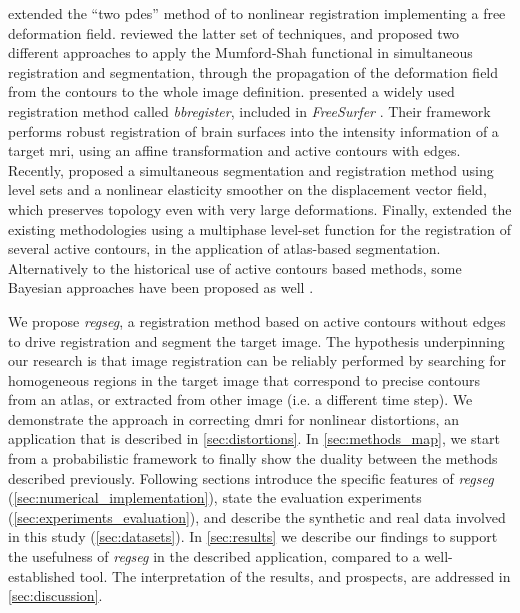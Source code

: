   extended the ``two \glspl*{pde}'' method of \cite{yezzi_variational_2001}
  to nonlinear registration implementing a free deformation field.
\cite{droske_mumfordshah_2009} reviewed the latter set of techniques, and proposed two different
  approaches to apply the Mumford-Shah functional \citep{mumford_optimal_1989} in simultaneous
  registration and segmentation, through the propagation of the deformation field from
  the contours to the whole image definition.
\cite{greve_accurate_2009} presented a widely used registration method called \emph{bbregister},
  included in \emph{FreeSurfer} \citep{fischl_freesurfer_2012}.
Their framework performs robust registration of brain surfaces into the intensity information
  of a target \gls*{mri}, using an affine transformation and active contours with edges.
Recently, \cite{guyader_combined_2011} proposed a simultaneous segmentation and
  registration method using level sets and a nonlinear elasticity smoother on the
  displacement vector field, which preserves topology even with very large deformations.
Finally, \cite{gorthi_active_2011} extended the existing methodologies using a multiphase
  level-set function for the registration of several active contours, in the application
  of atlas-based segmentation.
Alternatively to the historical use of active contours based methods, some Bayesian approaches
  have been proposed as well \citep{wyatt_map_2003,pohl_bayesian_2006,gass_simultaneous_2014}.

We propose \emph{regseg}, a registration method based on active contours without edges
  \citep{chan_active_2001} to drive registration and segment the target image.
The hypothesis underpinning our research is that image registration can be reliably performed
  by searching for homogeneous regions in the target image that correspond to precise contours
  from an atlas, or extracted from other image (i.e. a different time step).
We demonstrate the approach in correcting \gls*{dmri} for nonlinear distortions, an application
  that is described in \autoref{sec:distortions}.
In \autoref{sec:methods_map}, we start from a probabilistic framework to finally show the duality
  between the methods described previously.
Following sections introduce
  the specific features of \emph{regseg} (\autoref{sec:numerical_implementation}),
  state the evaluation experiments (\autoref{sec:experiments_evaluation}),
  and describe the synthetic and real data involved in this study (\autoref{sec:datasets}).
In \autoref{sec:results} we describe our findings to support the usefulness of \emph{regseg}
  in the described application, compared to a well-established tool.
The interpretation of the results, and prospects, are addressed in \autoref{sec:discussion}.


